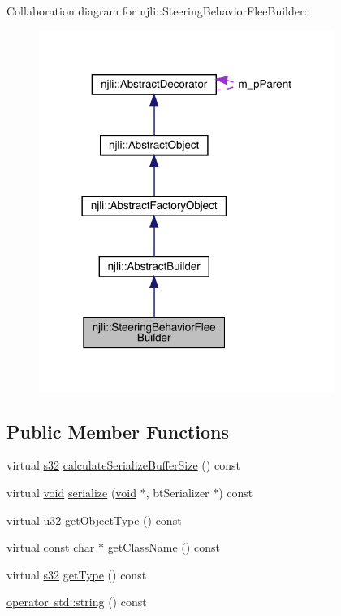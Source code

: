 Collaboration diagram for njli\+:\+:Steering\+Behavior\+Flee\+Builder\+:\nopagebreak
\begin{figure}[H]
\begin{center}
\leavevmode
\includegraphics[width=273pt]{classnjli_1_1_steering_behavior_flee_builder__coll__graph}
\end{center}
\end{figure}
\subsection*{Public Member Functions}
\begin{DoxyCompactItemize}
\item 
virtual \mbox{\hyperlink{_util_8h_aa62c75d314a0d1f37f79c4b73b2292e2}{s32}} \mbox{\hyperlink{classnjli_1_1_steering_behavior_flee_builder_a791f984566d8698fca7b123ad2ff236a}{calculate\+Serialize\+Buffer\+Size}} () const
\item 
virtual \mbox{\hyperlink{_thread_8h_af1e856da2e658414cb2456cb6f7ebc66}{void}} \mbox{\hyperlink{classnjli_1_1_steering_behavior_flee_builder_a57e7bb2526150f02b68efbb9abb9fb50}{serialize}} (\mbox{\hyperlink{_thread_8h_af1e856da2e658414cb2456cb6f7ebc66}{void}} $\ast$, bt\+Serializer $\ast$) const
\item 
virtual \mbox{\hyperlink{_util_8h_a10e94b422ef0c20dcdec20d31a1f5049}{u32}} \mbox{\hyperlink{classnjli_1_1_steering_behavior_flee_builder_a670080c9d52cee1096c828e38ae2dd31}{get\+Object\+Type}} () const
\item 
virtual const char $\ast$ \mbox{\hyperlink{classnjli_1_1_steering_behavior_flee_builder_a4fa3eadb353fc868847d9237b128aea8}{get\+Class\+Name}} () const
\item 
virtual \mbox{\hyperlink{_util_8h_aa62c75d314a0d1f37f79c4b73b2292e2}{s32}} \mbox{\hyperlink{classnjli_1_1_steering_behavior_flee_builder_a220154057d5925831cd3bbfb9cbe8eb4}{get\+Type}} () const
\item 
\mbox{\hyperlink{classnjli_1_1_steering_behavior_flee_builder_a5c6ed4df574992675eb753c0b37fae76}{operator std\+::string}} () const
\end{DoxyCompactItemize}
